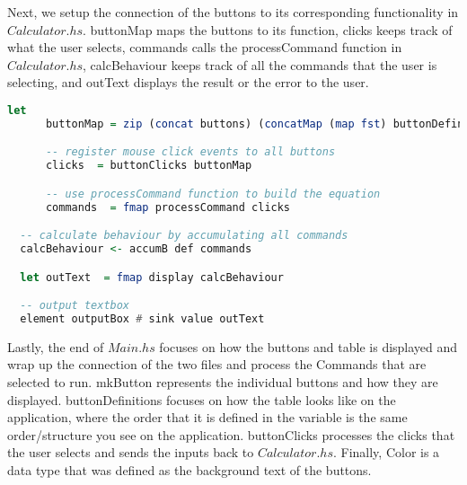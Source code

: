 \documentclass{article}
\begin{document}
\noindent
Next, we setup the connection of the buttons to its corresponding functionality in $Calculator.hs$. buttonMap maps the buttons to its function, clicks keeps track of what the user selects, commands calls the processCommand function in $Calculator.hs$, calcBehaviour keeps track of all the commands that the user is selecting, and outText displays the result or the error to the user. 

\begin{lstlisting}[language=Haskell]
let  
      buttonMap = zip (concat buttons) (concatMap (map fst) buttonDefinitions)

      -- register mouse click events to all buttons
      clicks  = buttonClicks buttonMap

      -- use processCommand function to build the equation
      commands  = fmap processCommand clicks

  -- calculate behaviour by accumulating all commands  
  calcBehaviour <- accumB def commands

  let outText  = fmap display calcBehaviour

  -- output textbox
  element outputBox # sink value outText
 \end{lstlisting}

\noindent
Lastly, the end of $Main.hs$ focuses on how the buttons and table is displayed and wrap up the connection of the two files and process the Commands that are selected to run. mkButton represents the individual buttons and how they are displayed. buttonDefinitions focuses on how the table looks like on the application, where the order that it is defined in the variable is the same order/structure you see on the application. buttonClicks processes the clicks that the user selects and sends the inputs back to $Calculator.hs$. Finally, Color is a data type that was defined as the background text of the buttons. 
\end{document}
